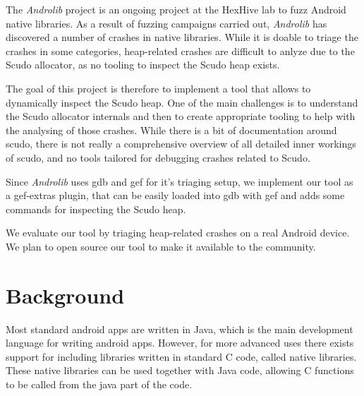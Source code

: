 \documentclass[a4paper,11pt,oneside]{report}
\begin{document}

The \textit{Androlib} project is an ongoing 
project at the HexHive lab to fuzz Android native libraries.
As a result of fuzzing campaigns carried out, \textit{Androlib} has discovered a 
number of crashes in native libraries.
While it is doable to triage the crashes in some categories, heap-related
crashes are difficult to anlyze due to the Scudo allocator, as no tooling 
to inspect the Scudo heap exists.

The goal of this project is therefore to implement a tool that allows to dynamically 
inspect the Scudo heap. 
One of the main challenges is 
to understand the Scudo allocator internals and then to
create appropriate tooling to help with the analysing of those crashes.
While there is a bit of documentation around scudo, there is not really a
comprehensive overview of all detailed inner workings of scudo, and no 
tools tailored for debugging crashes related to Scudo.

Since \textit{Androlib} uses gdb and gef for it's triaging setup, we implement our tool as a gef-extras plugin, 
that can be easily loaded into gdb with gef and adds some commands for inspecting the
Scudo heap.
 
We evaluate our tool by triaging  heap-related crashes on a real Android 
device.
We plan to open source our tool to make it available to the community.

\chapter{Background}


Most standard android apps are written in Java, which is the main development
language for writing android apps. However, for more advanced uses there exists
support for including libraries written in standard C code, called native libraries. 
These native libraries can be used together with Java code,
allowing C functions to be called from the java part of the code.
\end{document}
